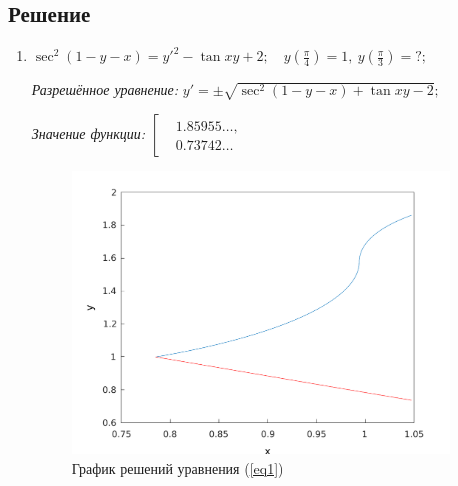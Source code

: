 \documentclass[14pt, a4paper, titlepage, fleqn]{extarticle}
\begin{document}
        
        \subsection{Решение}
            \begin{enumerate}
                \item \( \sec^2{(1 -y- x)} = y'^2 - \tan{xy} + 2; \quad y \left( \frac{\pi}{4} \right) = 1, ~ y \left( \frac{\pi}{3} \right) = ?;  \)
                    \label{eq1}

                    \textit{Разрешённое уравнение:}
                        \( y' = \pm \sqrt{\sec^2 \left( 1 - y - x \right) + \tan{xy} - 2}; \)

                    \textit{Значение функции:}
                        \( \left[
                            \begin{aligned}
                                &1.85955\dots, \\
                                &0.73742\dots
                            \end{aligned}
                        \right. \)

                    \begin{figure}[H]
                        \centering
                        \includegraphics[width=10cm]{pictures/graph2_1.pdf}
                        \caption{График решений уравнения (\ref{eq1})}
                    \end{figure}

                    \pagebreak
                    

                \pagebreak
                


\end{enumerate}
\end{document}
